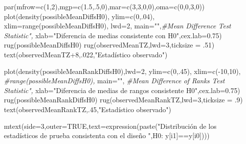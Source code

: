 \documentclass[
]{article}
\newenvironment{Shaded}{\begin{snugshade}}{\end{snugshade}}
\newcommand{\AttributeTok}[1]{\textcolor[rgb]{0.77,0.63,0.00}{#1}}
\newcommand{\CommentTok}[1]{\textcolor[rgb]{0.56,0.35,0.01}{\textit{#1}}}
\newcommand{\ConstantTok}[1]{\textcolor[rgb]{0.00,0.00,0.00}{#1}}
\newcommand{\DecValTok}[1]{\textcolor[rgb]{0.00,0.00,0.81}{#1}}
\newcommand{\FloatTok}[1]{\textcolor[rgb]{0.00,0.00,0.81}{#1}}
\newcommand{\FunctionTok}[1]{\textcolor[rgb]{0.00,0.00,0.00}{#1}}
\newcommand{\NormalTok}[1]{#1}
\newcommand{\SpecialCharTok}[1]{\textcolor[rgb]{0.00,0.00,0.00}{#1}}
\newcommand{\StringTok}[1]{\textcolor[rgb]{0.31,0.60,0.02}{#1}}
\begin{document}
\begin{Shaded}
\begin{Highlighting}[]
\FunctionTok{par}\NormalTok{(}\AttributeTok{mfrow=}\FunctionTok{c}\NormalTok{(}\DecValTok{1}\NormalTok{,}\DecValTok{2}\NormalTok{),}\AttributeTok{mgp=}\FunctionTok{c}\NormalTok{(}\FloatTok{1.5}\NormalTok{,.}\DecValTok{5}\NormalTok{,}\DecValTok{0}\NormalTok{),}\AttributeTok{mar=}\FunctionTok{c}\NormalTok{(}\DecValTok{3}\NormalTok{,}\DecValTok{3}\NormalTok{,}\DecValTok{0}\NormalTok{,}\DecValTok{0}\NormalTok{),}\AttributeTok{oma=}\FunctionTok{c}\NormalTok{(}\DecValTok{0}\NormalTok{,}\DecValTok{0}\NormalTok{,}\DecValTok{3}\NormalTok{,}\DecValTok{0}\NormalTok{))}
\FunctionTok{plot}\NormalTok{(}\FunctionTok{density}\NormalTok{(possibleMeanDiffsH0),}
     \AttributeTok{ylim=}\FunctionTok{c}\NormalTok{(}\DecValTok{0}\NormalTok{,.}\DecValTok{04}\NormalTok{),}
     \AttributeTok{xlim=}\FunctionTok{range}\NormalTok{(possibleMeanDiffsH0),}
     \AttributeTok{lwd=}\DecValTok{2}\NormalTok{,}
     \AttributeTok{main=}\StringTok{""}\NormalTok{,}\CommentTok{\#Mean Difference Test Statistic",}
     \AttributeTok{xlab=}\StringTok{"Diferencia de medias consistente con H0"}\NormalTok{,}\AttributeTok{cex.lab=}\FloatTok{0.75}\NormalTok{)}
\FunctionTok{rug}\NormalTok{(possibleMeanDiffsH0)}
\FunctionTok{rug}\NormalTok{(observedMeanTZ,}\AttributeTok{lwd=}\DecValTok{3}\NormalTok{,}\AttributeTok{ticksize =}\NormalTok{ .}\DecValTok{51}\NormalTok{)}
\FunctionTok{text}\NormalTok{(observedMeanTZ}\SpecialCharTok{+}\DecValTok{8}\NormalTok{,.}\DecValTok{022}\NormalTok{,}\StringTok{"Estadístico observado"}\NormalTok{)}

\FunctionTok{plot}\NormalTok{(}\FunctionTok{density}\NormalTok{(possibleMeanRankDiffsH0),}\AttributeTok{lwd=}\DecValTok{2}\NormalTok{,}
     \AttributeTok{ylim=}\FunctionTok{c}\NormalTok{(}\DecValTok{0}\NormalTok{,.}\DecValTok{45}\NormalTok{),}
     \AttributeTok{xlim=}\FunctionTok{c}\NormalTok{(}\SpecialCharTok{{-}}\DecValTok{10}\NormalTok{,}\DecValTok{10}\NormalTok{), }\CommentTok{\#range(possibleMeanDiffsH0),}
     \AttributeTok{main=}\StringTok{""}\NormalTok{, }\CommentTok{\#Mean Difference of Ranks Test Statistic",}
     \AttributeTok{xlab=}\StringTok{"Diferencia de medias de rangos consistente  H0"}\NormalTok{,}\AttributeTok{cex.lab=}\FloatTok{0.75}\NormalTok{)}
\FunctionTok{rug}\NormalTok{(possibleMeanRankDiffsH0)}
\FunctionTok{rug}\NormalTok{(observedMeanRankTZ,}\AttributeTok{lwd=}\DecValTok{3}\NormalTok{,}\AttributeTok{ticksize =}\NormalTok{ .}\DecValTok{9}\NormalTok{)}
\FunctionTok{text}\NormalTok{(observedMeanRankTZ,.}\DecValTok{45}\NormalTok{,}\StringTok{"Estadístico observado"}\NormalTok{)}

\FunctionTok{mtext}\NormalTok{(}\AttributeTok{side=}\DecValTok{3}\NormalTok{,}\AttributeTok{outer=}\ConstantTok{TRUE}\NormalTok{,}\AttributeTok{text=}\FunctionTok{expression}\NormalTok{(}\FunctionTok{paste}\NormalTok{(}\StringTok{"Distribución de los estadísticos de prueba consistenta con el diseño "}\NormalTok{,H0}\SpecialCharTok{:}\NormalTok{ y[i1]}\SpecialCharTok{==}\NormalTok{y[i0])))}
\end{Highlighting}
\end{Shaded}
\end{document}

